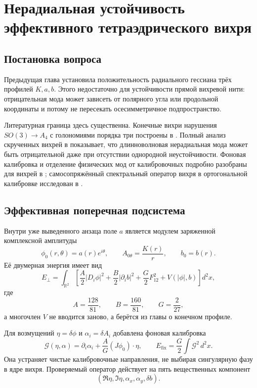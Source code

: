 \chapter{Нерадиальная устойчивость эффективного тетраэдрического вихря}

\section{Постановка вопроса}

Предыдущая глава установила положительность радиального гессиана трёх
профилей $K,a,b$. Этого недостаточно для устойчивости прямой вихревой
нити: отрицательная мода может зависеть от полярного угла или продольной
координаты и потому не пересекать осесимметричное подпространство.

Литературная граница здесь существенна. Конечные вихри нарушения
$SO(3)\to A_4$ с голономиями порядка три построены в
. Полный анализ скрученных вихрей в
 показывает, что длинноволновая нерадиальная мода
может быть отрицательной даже при отсутствии однородной неустойчивости.
Фоновая калибровка и отделение физических мод от калибровочных подробно
разобраны для вихрей в ; самосопряжённый
спектральный оператор вихря в ортогональной калибровке исследован в
.

\section{Эффективная поперечная подсистема}

Внутри уже выведенного анзаца поле $a$ является модулем заряженной
комплексной амплитуды
\begin{equation}
 \phi_0(r,\theta)=a(r)e^{i\theta},
 \qquad
 A_{0\theta}=\frac{K(r)}{r},
 \qquad b_0=b(r).
\end{equation}
Её двумерная энергия имеет вид
\begin{equation}
 E_\perp=\int_{\mathbb R^2}
 \left[
  \frac A2|D_i\phi|^2+\frac B2|\partial_i b|^2
  +\frac G2F_{12}^2+V(|\phi|,b)
 \right]d^2x,
 \label{eq:v6-angular-effective-energy}
\end{equation}
где
\begin{equation}
 A=\frac{128}{81},\qquad
 B=\frac{160}{81},\qquad
 G=\frac{2}{27},
\end{equation}
а многочлен $V$ не вводится заново, а берётся из главы о конечном
профиле.

Для возмущений $\eta=\delta\phi$ и $\alpha_i=\delta A_i$ добавлена
фоновая калибровка
\begin{equation}
 \mathcal G(\eta,\alpha)
 =\partial_i\alpha_i+\frac AG(J\phi_0)\mathbin{\cdot}\eta,
 \qquad
 E_{\mathrm{fix}}=\frac G2\int \mathcal G^2\,d^2x.
 \label{eq:v6-angular-background-gauge}
\end{equation}
Она устраняет чистые калибровочные направления, не выбирая сингулярную
фазу в ядре вихря. Проверяемый оператор действует на пять вещественных
компонент
\begin{equation}
 (\Re\eta,\Im\eta,\alpha_x,\alpha_y,\delta b).
\end{equation}

